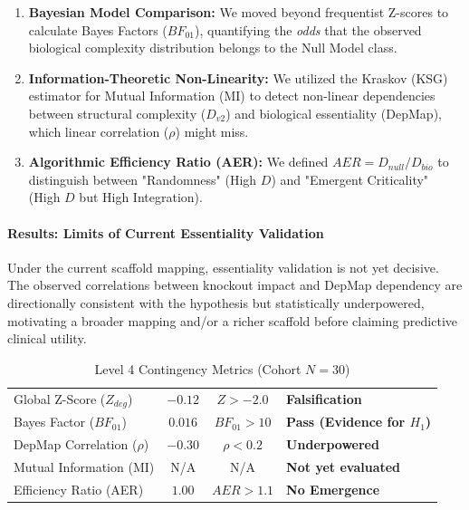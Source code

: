 \begin{enumerate}
    \item \textbf{Bayesian Model Comparison:} We moved beyond frequentist Z-scores to calculate Bayes Factors ($BF_{01}$), quantifying the \textit{odds} that the observed biological complexity distribution belongs to the Null Model class.
    \item \textbf{Information-Theoretic Non-Linearity:} We utilized the Kraskov (KSG) estimator for Mutual Information (MI) to detect non-linear dependencies between structural complexity ($D_{v2}$) and biological essentiality (DepMap), which linear correlation ($\rho$) might miss.
    \item \textbf{Algorithmic Efficiency Ratio (AER):} We defined $AER = D_{null} / D_{bio}$ to distinguish between "Randomness" (High $D$) and "Emergent Criticality" (High $D$ but High Integration).
\end{enumerate}

\paragraph{Results: Limits of Current Essentiality Validation}
Under the current scaffold mapping, essentiality validation is not yet decisive. The observed correlations between knockout impact and DepMap dependency are directionally consistent with the hypothesis but statistically underpowered, motivating a broader mapping and/or a richer scaffold before claiming predictive clinical utility.

\begin{table}[H]
\centering
\caption{Level 4 Contingency Metrics (Cohort $N=30$)}
\label{tab:lev4_metrics}
\begin{tabular}{@{}l c c l@{}}
\toprule
Global Z-Score ($Z_{deg}$) & $-0.12$ & $Z > -2.0$ & \textbf{Falsification} \\
Bayes Factor ($BF_{01}$) & $0.016$ & $BF_{01} > 10$ & \textbf{Pass (Evidence for $H_1$)} \\
DepMap Correlation ($\rho$) & $-0.30$ & $\rho < 0.2$ & \textbf{Underpowered} \\
Mutual Information (MI) & N/A & N/A & \textbf{Not yet evaluated} \\
Efficiency Ratio (AER) & $1.00$ & $AER > 1.1$ & \textbf{No Emergence} \\ \bottomrule
\end{tabular}
\end{table}

